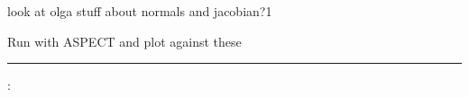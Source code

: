 look at olga stuff about normals and jacobian?1

Run with ASPECT and plot against these


















\newpage
\par\noindent\rule{\textwidth}{0.4pt}

\vspace{.5cm}

\begin{center}
\end{center}

\vspace{.5cm}

\noindent\Literature:\\
\\


